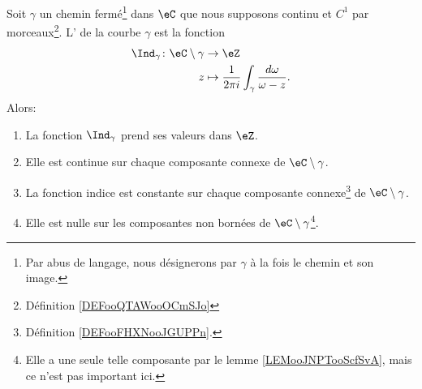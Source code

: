 \begin{propositionDef}      \label{DEFooLFBNooGlvJmp}
	Soit \( \gamma\) un chemin fermé\footnote{Par abus de langage, nous désignerons par \( \gamma\) à la fois le chemin et son image.} dans \( \eC\) que nous supposons continu et \( C^1\) par morceaux\footnote{Définition \ref{DEFooQTAWooOCmSJo}}. L' de la courbe \( \gamma\) est la fonction
	\begin{equation}
		\begin{aligned}
			\Ind_{\gamma}\colon \eC\setminus \gamma & \to \eZ                                                              \\
			z                                       & \mapsto \frac{1}{ 2\pi i }\int_{\gamma}\frac{ d\omega }{ \omega-z }.
		\end{aligned}
	\end{equation}
	Alors:
	\begin{enumerate}
		\item		\label{ITEMooHYHMooWcaJxP}
		      La fonction \( \Ind_{\gamma}\) prend ses valeurs dans \( \eZ\).
		\item
		      Elle est continue sur chaque composante connexe de \( \eC\setminus \gamma\).
		\item
		      La fonction indice est constante sur chaque composante connexe\footnote{Définition \ref{DEFooFHXNooJGUPPn}.} de \( \eC\setminus \gamma\).
		\item
		      Elle est nulle sur les composantes non bornées de \( \eC\setminus\gamma\)\footnote{Elle a une seule telle composante par le lemme \ref{LEMooJNPTooScfSvA}, mais ce n'est pas important ici.}.
	\end{enumerate}
\end{propositionDef}

